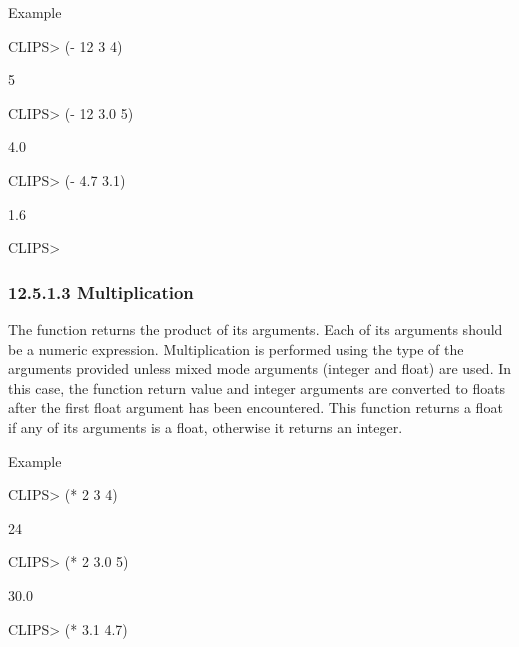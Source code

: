 \documentclass[letterpaper,10pt,english]{sphinxmanual}
\begin{document}

\begin{sphinxVerbatim}[commandchars=\\\{\}]
  
\end{sphinxVerbatim}

Example

CLIPS\textgreater{} (- 12 3 4)

5

CLIPS\textgreater{} (- 12 3.0 5)

4.0

CLIPS\textgreater{} (- 4.7 3.1)

1.6

CLIPS\textgreater{}


\subsubsection{12.5.1.3 Multiplication}
\label{\detokenize{actions:multiplication}}
The \sphinxstylestrong{*} function returns the product of its arguments. Each of its
arguments should be a numeric expression. Multiplication is performed
using the type of the arguments provided unless mixed mode arguments
(integer and float) are used. In this case, the function return value
and integer arguments are converted to floats after the first float
argument has been encountered. This function returns a float if any of
its arguments is a float, otherwise it returns an integer.


\begin{sphinxVerbatim}[commandchars=\\\{\}]
\PYGZbs{}  
\end{sphinxVerbatim}

Example

CLIPS\textgreater{} (* 2 3 4)

24

CLIPS\textgreater{} (* 2 3.0 5)

30.0

CLIPS\textgreater{} (* 3.1 4.7)
\end{document}
